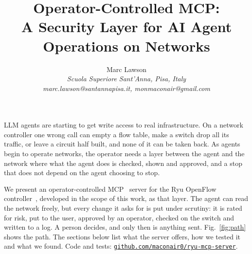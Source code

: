 \documentclass[10pt,letterpaper]{article}
\title{\textbf{Operator-Controlled MCP:\\ A Security Layer for AI Agent Operations on Networks}}
\author{Marc Lawson\\[2pt]\small\itshape Scuola Superiore Sant'Anna, Pisa, Italy\\\small\itshape marc.lawson@santannapisa.it, monmaconair@gmail.com}
\date{}
\begin{document}
\maketitle
\thispagestyle{empty}
\vspace{-1.2em}

LLM agents are starting to get write access to real infrastructure. On a network controller one wrong call can empty a flow table, make a switch drop all its traffic, or leave a circuit half built, and none of it can be taken back. As agents begin to operate networks, the operator needs a layer between the agent and the network where what the agent does is checked, shown and approved, and a stop that does not depend on the agent choosing to stop.

We present an operator-controlled MCP~\cite{mcp} server for the Ryu OpenFlow controller~\cite{ryu}, developed in the scope of this work, as that layer. The agent can read the network freely, but every change it asks for is put under scrutiny: it is rated for risk, put to the user, approved by an operator, checked on the switch and written to a log. A person decides, and only then is anything sent. Fig.~\ref{fig:path} shows the path. The sections below list what the server offers, how we tested it and what we found. Code and tests: \href{https://github.com/maconair0/ryu-mcp-server}{\texttt{github.com/maconair0/ryu-mcp-server}}.
\end{document}

